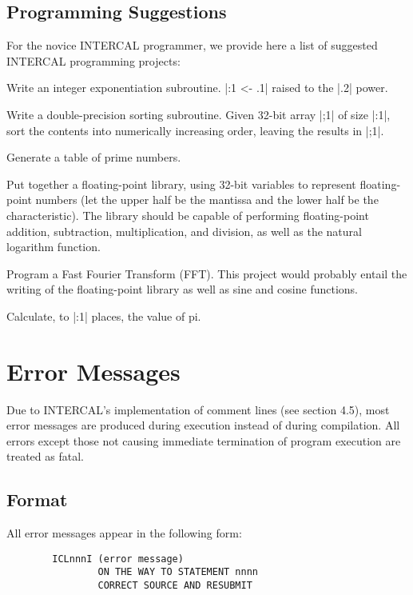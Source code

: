 \subsection{Programming Suggestions}

For the novice INTERCAL programmer, we provide here a list of suggested 
INTERCAL programming projects:

Write an integer exponentiation subroutine.  |:1 <- .1| raised to the |.2| power.

Write a double-precision sorting subroutine.  Given 32-bit array |;1| of
size |:1|, sort the contents into numerically increasing order, leaving the
results in |;1|.

Generate a table of prime numbers.

Put together a floating-point library, using 32-bit variables to represent
floating-point numbers (let the upper half be the mantissa and the lower
half be the characteristic).   The library should be capable of performing 
floating-point addition, subtraction, multiplication, and division, as well
as the natural logarithm function.

Program a Fast Fourier Transform (FFT).   This project would probably entail
the writing of the floating-point library as well as sine and cosine functions.

Calculate, to |:1| places, the value of pi.







\section{Error Messages}

Due to INTERCAL's implementation of comment lines (see section 4.5), most
error messages are produced during execution instead of during compilation.
All errors except those not causing immediate termination of program execution
are treated as fatal.

\subsection{Format}

All error messages appear in the following form:

\begin{verbatim}
        ICLnnnI (error message)
                ON THE WAY TO STATEMENT nnnn
                CORRECT SOURCE AND RESUBMIT
\end{verbatim}

